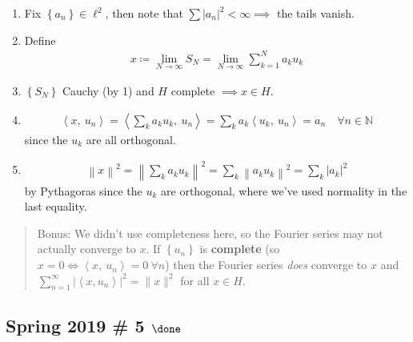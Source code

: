 \begin{solution}
\begin{enumerate}
\def\labelenumi{\arabic{enumi}.}
\item
  Fix \(\left\{{a_n}\right\} \in \ell^2\), then note that
  \(\sum {\left\lvert {a_n} \right\rvert}^2 < \infty \implies\) the
  tails vanish.
\item
  Define
  \begin{align*}
  x \coloneqq\displaystyle\lim_{N\to\infty} S_N = \lim_{N\to \infty} \sum_{k=1}^N a_k u_k
  \end{align*}
\item
  \(\left\{{S_N}\right\}\) Cauchy (by 1) and \(H\) complete
  \(\implies x\in H\).
\item

  \begin{align*}
  {\left\langle {x},~{u_n} \right\rangle} = {\left\langle {\sum_k a_k u_k},~{u_n} \right\rangle} = \sum_k a_k {\left\langle {u_k},~{u_n} \right\rangle} = a_n \quad \forall n\in {\mathbb{N}}
  \end{align*}
  since the \(u_k\) are all orthogonal.
\item

  \begin{align*}
  {\left\lVert {x} \right\rVert}^2 = {\left\lVert {\sum_k a_k u_k} \right\rVert}^2 = \sum_k {\left\lVert {a_k u_k} \right\rVert}^2 = \sum_k {\left\lvert {a_k} \right\rvert}^2
  \end{align*}
  by Pythagoras since the \(u_k\) are orthogonal, where we've used
  normality in the last equality.
\end{enumerate}

\begin{quote}
Bonus: We didn't use completeness here, so the Fourier series may not
actually converge to \(x\). If \(\left\{{u_n}\right\}\) is
\textbf{complete} (so
\(x = 0 \iff {\left\langle {x},~{u_n} \right\rangle} = 0 ~\forall n\))
then the Fourier series \emph{does} converge to \(x\) and
\(\sum_{n=1}^{\infty}\left|\left\langle x, u_{n}\right\rangle\right|^{2}=\|x\|^{2}\)
for all \(x \in H\).
\end{quote}

\end{solution}

\hypertarget{spring-2019-5-done}{%
\subsection{\texorpdfstring{Spring 2019 \# 5
\(\done\)}{Spring 2019 \# 5 \textbackslash done}}\label{spring-2019-5-done}}

